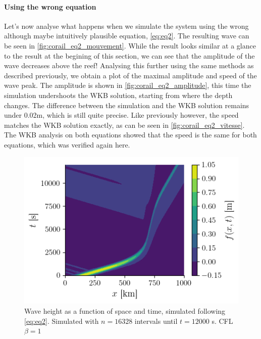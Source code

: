 \paragraph{Using the wrong equation} Let's now analyse what happens when we simulate the system using the wrong although maybe intuitively plausible equation, \autoref{eq:eq2}. The resulting wave can be seen in \autoref{fig:corail_eq2_mouvement}. While the result looks similar at a glance to the result at the begining of this section, we can see that the amplitude of the wave decreases above the reef! Analysing this further using the same methods as described previously, we obtain a plot of the maximal amplitude and speed of the wave peak. The amplitude is shown in \autoref{fig:corail_eq2_amplitude}, this time the simulation undershoots the WKB solution, starting from where the depth changes. The difference between the simulation and the WKB solution remains under 0.02m, which is still quite precise. Like previously however, the speed matches the WKB solution exactly, as can be seen in \autoref{fig:corail_eq2_vitesse}. The WKB analysis on both equations showed that the speed is the same for both equations, which was verified again here.

\begin{figure}[h]
    \centering
    \includegraphics[width=0.6\linewidth]{figures/corail_eq2_mouvement_vague.png}
    \caption{Wave height as a function of space and time, simulated following \autoref{eq:eq2}. Simulated with \(n=16328\) intervals until \(t=12000\) \si{\second}. CFL \(\beta=1\)}
    \label{fig:corail_eq2_mouvement}
\end{figure}

